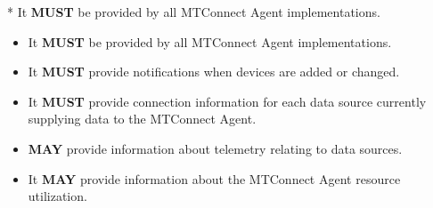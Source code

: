 * It \textbf{MUST} be provided by all \gls{MTConnect Agent} implementations.

\begin{itemize}
    \item It \textbf{MUST} be provided by all \gls{MTConnect Agent} implementations.
    \item It \textbf{MUST} provide notifications when devices are added or changed.
    \item It \textbf{MUST} provide connection information for each data source currently supplying data to the \gls{MTConnect Agent}.
    \item \textbf{MAY} provide information about telemetry relating to data sources.
    \item It \textbf{MAY} provide information about the \gls{MTConnect Agent} resource utilization.

\end{itemize}


